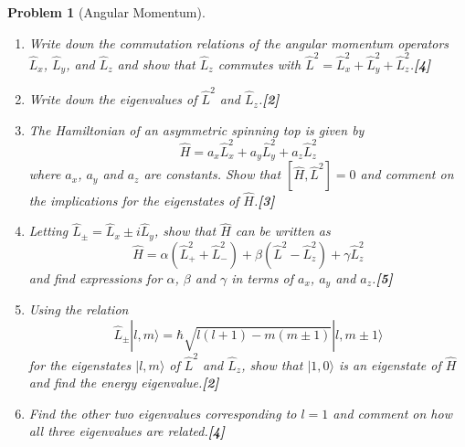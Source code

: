 \documentclass[a4paper]{article}
\theoremstyle{new}
\newtheorem{qns}{Problem}[subsection]
\begin{document}
\newpage
\begin{qns}[Angular Momentum]\leavevmode
\begin{enumerate}[label=(\roman*)]
\item Write down the commutation relations of the angular momentum operators $\hat{L}_x$, $\hat{L}_y$, and $\hat{L}_z$ and show that $\hat{L}_z$ commutes with $\hat{L}^2=\hat{L}_x^2+\hat{L}_y^2+\hat{L}_z^2$.\hfill\textbf{[4]}
\item Write down the eigenvalues of $\hat{L}^2$ and $\hat{L}_z$.\hfill\textbf{[2]}
\item The Hamiltonian of an asymmetric spinning top is given by
$$\hat{H}=a_x\hat{L}_x^2+a_y\hat{L}_y^2+a_z\hat{L}_z^2$$
where $a_x$, $a_y$ and $a_z$ are constants. Show that $[\hat{H},\hat{L}^2] = 0$ and comment on the implications for the eigenstates of $\hat{H}$.\hfill\textbf{[3]}
\item Letting $\hat{L}_\pm=\hat{L}_x\pm i\hat{L}_y$, show that $\hat{H}$ can be written as
$$\hat{H}=\alpha(\hat{L}_+^2+\hat{L}_-^2)+\beta(\hat{L}^2-\hat{L}_z^2)+\gamma\hat{L}_z^2$$
and find expressions for $\alpha$, $\beta$ and $\gamma$ in terms of $a_x$, $a_y$ and $a_z$.\hfill\textbf{[5]}
\item Using the relation
$$\hat{L}_\pm|l,m\rangle=\hbar\sqrt{l(l+1)-m(m\pm 1)}|l,m\pm 1\rangle$$
for the eigenstates $|l,m\rangle$ of $\hat{L}^2$ and $\hat{L}_z$, show that $|1,0\rangle$ is an eigenstate of $\hat{H}$ and find the energy eigenvalue.\hfill\textbf{[2]}
\item Find the other two eigenvalues corresponding to $l = 1$ and comment on how all three eigenvalues are related.\hfill\textbf{[4]}
\end{enumerate}
\end{qns}
\end{document}
